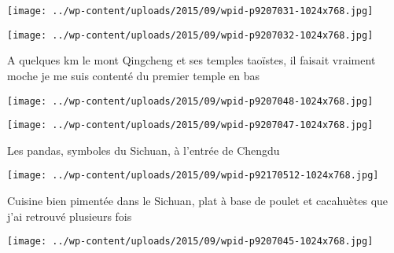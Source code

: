  

 

\begin{center} \texttt{[image: ../wp-content/uploads/2015/09/wpid-p9207031-1024x768.jpg]} \end{center}

 

 

\begin{center} \texttt{[image: ../wp-content/uploads/2015/09/wpid-p9207032-1024x768.jpg]} \end{center}

 

 A quelques km le mont Qingcheng et ses temples taoïstes, il faisait vraiment moche je me suis contenté du premier temple en bas 

 

\begin{center} \texttt{[image: ../wp-content/uploads/2015/09/wpid-p9207048-1024x768.jpg]} \end{center}

 

 

\begin{center} \texttt{[image: ../wp-content/uploads/2015/09/wpid-p9207047-1024x768.jpg]} \end{center}

 

 Les pandas, symboles du Sichuan, à l'entrée de Chengdu 

 

\begin{center} \texttt{[image: ../wp-content/uploads/2015/09/wpid-p92170512-1024x768.jpg]} \end{center}

 

 Cuisine bien pimentée dans le Sichuan, plat à base de poulet et cacahuètes que j'ai retrouvé plusieurs fois 

 

\begin{center} \texttt{[image: ../wp-content/uploads/2015/09/wpid-p9207045-1024x768.jpg]} \end{center}




 
 
